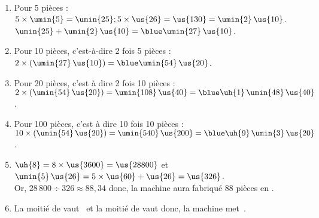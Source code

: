    \ \\ [-5mm]
   \begin{enumerate}
      \item Pour 5 pièces : \\
         $5\times\umin{5} =\umin{25} ; 5\times\us{26} =\us{130} =\umin{2}\,\us{10}$. \\
         $\umin{25}+\umin{2}\,\us{10} =\blue \umin{27}\,\us{10}$.
      \item Pour 10 pièces, c'est-à-dire 2 fois 5 pièces : \\
         $2\times(\umin{27}\,\us{10}) =\blue \umin{54}\,\us{20}$.
      \item Pour 20 pièces, c'est à dire 2 fois 10 pièces : \\         $2\times(\umin{54}\,\us{20}) =\umin{108}\,\us{40} =\blue \uh{1}\,\umin{48}\,\us{40}$.
      \item Pour 100 pièces, c'est à dire 10 fois 10 pièces : \\
         $10\times(\umin{54}\,\us{20}) =\umin{540}\,\us{200} =\blue \uh{9}\,\umin{3}\,\us{20}$.
      \item $\uh{8} =8\times\us{3600} =\us{28800}$ et \\
         $\umin{5}\,\us{26} =5\times\us{60}+\us{26} =\us{326}$. \\
      Or, $28\,800\div326 \approx88,34$ donc, {\blue la machine aura fabriqué 88 pièces en }.
      \item La moitié de  vaut \, et la moitié de  vaut  donc, {\blue la machine met \,}.
   \end{enumerate}
